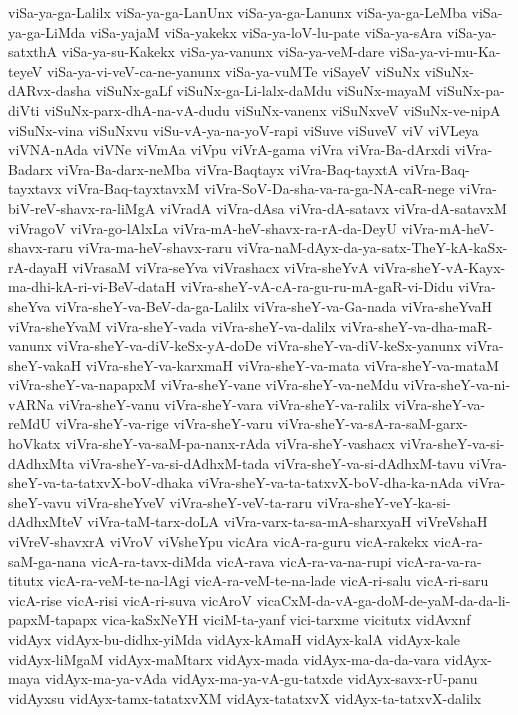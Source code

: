 {viSa-ya-ga-Lalilx
viSa-ya-ga-LanUnx
viSa-ya-ga-Lanunx
viSa-ya-ga-LeMba
viSa-ya-ga-LiMda
viSa-yajaM
viSa-yakekx
viSa-ya-loV-lu-pate
viSa-ya-sAra
viSa-ya-satxthA
viSa-ya-su-Kakekx
viSa-ya-vanunx
viSa-ya-veM-dare
viSa-ya-vi-mu-Ka-teyeV
viSa-ya-vi-veV-ca-ne-yanunx
viSa-ya-vuMTe
viSayeV
viSuNx
viSuNx-dARvx-dasha
viSuNx-gaLf
viSuNx-ga-Li-lalx-daMdu
viSuNx-mayaM
viSuNx-pa-diVti
viSuNx-parx-dhA-na-vA-dudu
viSuNx-vanenx
viSuNxveV
viSuNx-ve-nipA
viSuNx-vina
viSuNxvu
viSu-vA-ya-na-yoV-rapi
viSuve
viSuveV
viV
viVLeya
viVNA-nAda
viVNe
viVmAa
viVpu
viVrA-gama
viVra
viVra-Ba-dArxdi
viVra-Badarx
viVra-Ba-darx-neMba
viVra-Baqtayx
viVra-Baq-tayxtA
viVra-Baq-tayxtavx
viVra-Baq-tayxtavxM
viVra-SoV-Da-sha-va-ra-ga-NA-caR-nege
viVra-biV-reV-shavx-ra-liMgA
viVradA
viVra-dAsa
viVra-dA-satavx
viVra-dA-satavxM
viVragoV
viVra-go-lAlxLa
viVra-mA-heV-shavx-ra-rA-da-DeyU
viVra-mA-heV-shavx-raru
viVra-ma-heV-shavx-raru
viVra-naM-dAyx-da-ya-satx-TheY-kA-kaSx-rA-dayaH
viVrasaM
viVra-seYva
viVrashacx
viVra-sheYvA
viVra-sheY-vA-Kayx-ma-dhi-kA-ri-vi-BeV-dataH
viVra-sheY-vA-cA-ra-gu-ru-mA-gaR-vi-Didu
viVra-sheYva
viVra-sheY-va-BeV-da-ga-Lalilx
viVra-sheY-va-Ga-nada
viVra-sheYvaH
viVra-sheYvaM
viVra-sheY-vada
viVra-sheY-va-dalilx
viVra-sheY-va-dha-maR-vanunx
viVra-sheY-va-diV-keSx-yA-doDe
viVra-sheY-va-diV-keSx-yanunx
viVra-sheY-vakaH
viVra-sheY-va-karxmaH
viVra-sheY-va-mata
viVra-sheY-va-mataM
viVra-sheY-va-napapxM
viVra-sheY-vane
viVra-sheY-va-neMdu
viVra-sheY-va-ni-vARNa
viVra-sheY-vanu
viVra-sheY-vara
viVra-sheY-va-ralilx
viVra-sheY-va-reMdU
viVra-sheY-va-rige
viVra-sheY-varu
viVra-sheY-va-sA-ra-saM-garx-hoVkatx
viVra-sheY-va-saM-pa-nanx-rAda
viVra-sheY-vashacx
viVra-sheY-va-si-dAdhxMta
viVra-sheY-va-si-dAdhxM-tada
viVra-sheY-va-si-dAdhxM-tavu
viVra-sheY-va-ta-tatxvX-boV-dhaka
viVra-sheY-va-ta-tatxvX-boV-dha-ka-nAda
viVra-sheY-vavu
viVra-sheYveV
viVra-sheY-veV-ta-raru
viVra-sheY-veY-ka-si-dAdhxMteV
viVra-taM-tarx-doLA
viVra-varx-ta-sa-mA-sharxyaH
viVreVshaH
viVreV-shavxrA
viVroV
viVsheYpu
vicAra
vicA-ra-guru
vicA-rakekx
vicA-ra-saM-ga-nana
vicA-ra-tavx-diMda
vicA-rava
vicA-ra-va-na-rupi
vicA-ra-va-ra-titutx
vicA-ra-veM-te-na-lAgi
vicA-ra-veM-te-na-lade
vicA-ri-salu
vicA-ri-saru
vicA-rise
vicA-risi
vicA-ri-suva
vicAroV
vicaCxM-da-vA-ga-doM-de-yaM-da-da-li-papxM-tapapx
vica-kaSxNeYH
viciM-ta-yanf
vici-tarxme
vicitutx
vidAvxnf
vidAyx
vidAyx-bu-didhx-yiMda
vidAyx-kAmaH
vidAyx-kalA
vidAyx-kale
vidAyx-liMgaM
vidAyx-maMtarx
vidAyx-mada
vidAyx-ma-da-da-vara
vidAyx-maya
vidAyx-ma-ya-vAda
vidAyx-ma-ya-vA-gu-tatxde
vidAyx-savx-rU-panu
vidAyxsu
vidAyx-tamx-tatatxvXM
vidAyx-tatatxvX
vidAyx-ta-tatxvX-dalilx
}
